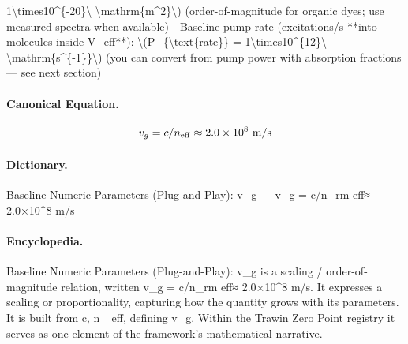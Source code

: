 1\textbackslash{}times10\textasciicircum{}\{-20\}\textbackslash{} \textbackslash{}mathrm\{m\textasciicircum{}2\}\textbackslash{}) (order-of-magnitude for organic dyes; use measured spectra when available) - Baseline pump rate (excitations/s **into molecules inside V\_eff**): \textbackslash{}(P\_\{\textbackslash{}text\{rate\}\} = 1\textbackslash{}times10\textasciicircum{}\{12\}\textbackslash{} \textbackslash{}mathrm\{s\textasciicircum{}\{-1\}\}\textbackslash{}) (you can convert from pump power with absorption fractions — see next section)

\paragraph{Canonical Equation.}
\[
v_g = c/n_{\rm eff}\approx 2.0\times10^8\ \mathrm{m/s}
\]

\paragraph{Dictionary.}
Baseline Numeric Parameters (Plug-and-Play): v\_g — v\_g = c/n\_rm eff≈ 2.0×10\textasciicircum{}8 m/s

\paragraph{Encyclopedia.}
Baseline Numeric Parameters (Plug-and-Play): v\_g is a scaling / order-of-magnitude relation, written v\_g = c/n\_rm eff≈ 2.0×10\textasciicircum{}8 m/s. It expresses a scaling or proportionality, capturing how the quantity grows with its parameters. It is built from c, n\_ eff, defining v\_g. Within the Trawin Zero Point registry it serves as one element of the framework's mathematical narrative.
